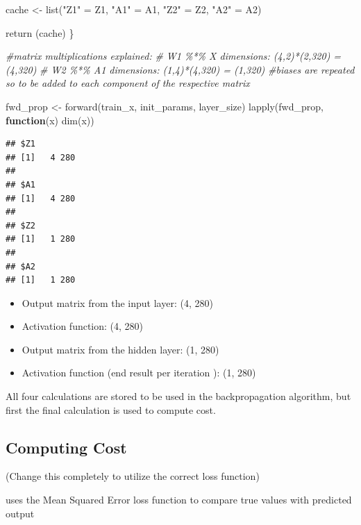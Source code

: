 \documentclass[
]{article}
\newenvironment{Shaded}{\begin{snugshade}}{\end{snugshade}}
\newcommand{\CommentTok}[1]{\textcolor[rgb]{0.56,0.35,0.01}{\textit{#1}}}
\newcommand{\ControlFlowTok}[1]{\textcolor[rgb]{0.13,0.29,0.53}{\textbf{#1}}}
\newcommand{\FunctionTok}[1]{\textcolor[rgb]{0.00,0.00,0.00}{#1}}
\newcommand{\NormalTok}[1]{#1}
\newcommand{\OtherTok}[1]{\textcolor[rgb]{0.56,0.35,0.01}{#1}}
\newcommand{\StringTok}[1]{\textcolor[rgb]{0.31,0.60,0.02}{#1}}
\providecommand{\tightlist}{%
  \setlength{\itemsep}{0pt}\setlength{\parskip}{0pt}}
\begin{document}
\begin{Shaded}
\begin{Highlighting}[]
  
\NormalTok{  cache }\OtherTok{\textless{}{-}} \FunctionTok{list}\NormalTok{(}\StringTok{"Z1"} \OtherTok{=}\NormalTok{ Z1,}
                \StringTok{"A1"} \OtherTok{=}\NormalTok{ A1, }
                \StringTok{"Z2"} \OtherTok{=}\NormalTok{ Z2,}
                \StringTok{"A2"} \OtherTok{=}\NormalTok{ A2)}
  
  \FunctionTok{return}\NormalTok{ (cache)}
\NormalTok{\}}

\CommentTok{\#matrix multiplications explained:}
\CommentTok{\# W1 \%*\% X dimensions: (4,2)*(2,320) = (4,320)}
\CommentTok{\# W2 \%*\% A1 dimensions: (1,4)*(4,320) = (1,320)}
\CommentTok{\#biases are repeated so to be added to each component of the respective matrix}

\NormalTok{fwd\_prop }\OtherTok{\textless{}{-}} \FunctionTok{forward}\NormalTok{(train\_x, init\_params, layer\_size)}
\FunctionTok{lapply}\NormalTok{(fwd\_prop, }\ControlFlowTok{function}\NormalTok{(x) }\FunctionTok{dim}\NormalTok{(x))}
\end{Highlighting}
\end{Shaded}

\begin{verbatim}
## $Z1
## [1]   4 280
## 
## $A1
## [1]   4 280
## 
## $Z2
## [1]   1 280
## 
## $A2
## [1]   1 280
\end{verbatim}

\begin{itemize}
\tightlist
\item
  Output matrix from the input layer: (4, 280)
\item
  Activation function: (4, 280)
\item
  Output matrix from the hidden layer: (1, 280)
\item
  Activation function (end result per iteration ): (1, 280)
\end{itemize}

All four calculations are stored to be used in the backpropagation
algorithm, but first the final calculation is used to compute cost.

\hypertarget{computing-cost}{%
\subsection{Computing Cost}\label{computing-cost}}

(Change this completely to utilize the correct loss function)

uses the Mean Squared Error loss function to compare true values with
predicted output
\end{document}
